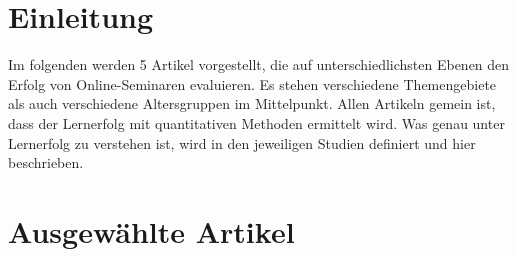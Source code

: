\documentclass[12pt, bibliography=totoc]{scrartcl}
\begin{document}

\tableofcontents
\listoftables
\setcounter{page}{1}
\pagebreak
\section{Einleitung}\label{einleitung}

Im folgenden werden 5 Artikel vorgestellt, die auf unterschiedlichsten
Ebenen den Erfolg von Online-Seminaren evaluieren. Es stehen
verschiedene Themengebiete als auch verschiedene Altersgruppen im
Mittelpunkt. Allen Artikeln gemein ist, dass der Lernerfolg mit
quantitativen Methoden ermittelt wird. Was genau unter Lernerfolg zu
verstehen ist, wird in den jeweiligen Studien definiert und hier
beschrieben.

\section{Ausgewählte Artikel}\label{ausgewuxe4hlte-artikel}

\textbf{}


\parencite{Stocker2009}

\end{document}
